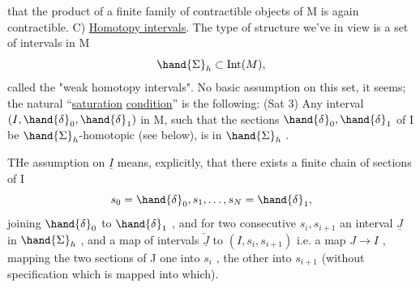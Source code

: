 that the product of a finite family of contractible objects of M is again
contractible.
 C)  \uline{Homotopy intervals}. The type  of structure we've in view is a
set  of intervals in M
\[ \hand{\Sigma}_h \subset \mathrm{Int}(M), \]
called the "weak homotopy intervals". No basic assumption on this set,
it seems;  the natural ``\uline{saturation} \uline{condition}'' is the following:
(Sat 3)   Any interval  $(I,\hand{\delta}_0,\hand{\delta}_1)$ in M,  such that the sections $\hand{\delta}_0,\hand{\delta}_1$
of I be $\hand{\Sigma}_h$-homotopic (see below),  is in $\hand{\Sigma}_h$ .

THe assumption on $\underline{I}$ means,  explicitly,  that there exists a finite
chain of sections of I
\[ s_0=\hand{\delta}_0, s_1, \ldots , s_N=\hand{\delta}_1 , \]
joining $\hand{\delta}_0$ to $\hand{\delta}_1$ ,  and for two consecutive  $s_i, s_{i+1}$  an interval
$\underline{J}$ in $\hand{\Sigma}_h$ ,  and a  map of intervals  $\check{\underline{J}}$ to $(I,s_i,s_{i+1})$  i.e. a map
$J \to I$ ,  mapping the two   sections of J  one into $s_i$ , the other
into $s_{i+1}$ (without specification which is mapped into which).

